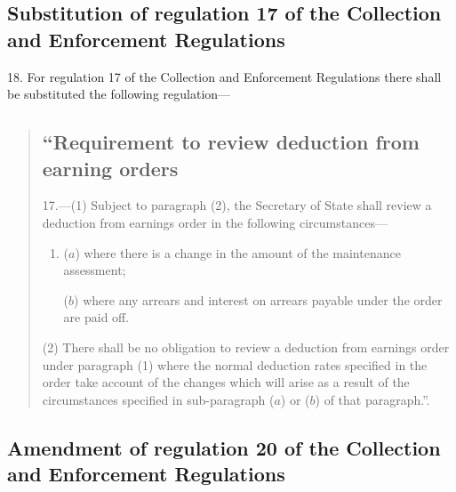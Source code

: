 \documentclass[12pt,a4paper]{article}
\begin{document}
\subsection[18. Substitution of regulation 17 of the Collection and Enforcement Regulations]{Substitution of regulation 17 of the Collection and Enforcement Regulations}

18.  For regulation 17 of the Collection and Enforcement Regulations there shall be substituted the following regulation—
\begin{quotation}
\subsection*{\sloppy “Requirement to review deduction from earning orders}

17.—(1) Subject to paragraph (2), the Secretary of State shall review a deduction from earnings order in the following circumstances—
\begin{enumerate}\item[]
($a$) where there is a change in the amount of the maintenance assessment;

($b$) where any arrears and interest on arrears payable under the order are paid off.
\end{enumerate}

(2) There shall be no obligation to review a deduction from earnings order under paragraph (1) where the normal deduction rates specified in the order take account of the changes which will arise as a result of the circumstances specified in sub-paragraph ($a$) or ($b$) of that paragraph.”.
\end{quotation}

\subsection[19. Amendment of regulation 20 of the Collection and Enforcement Regulations]{Amendment of regulation 20 of the Collection and Enforcement Regulations}
\end{document}
